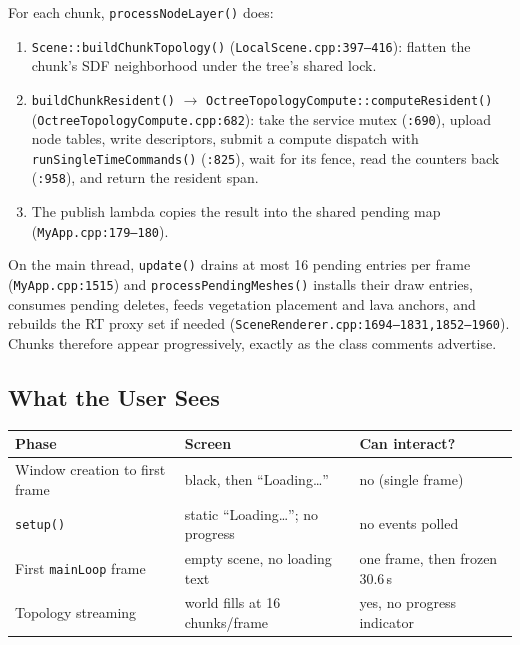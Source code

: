 \documentclass[11pt,a4paper]{article}
\begin{document}
For each chunk, \texttt{processNodeLayer()} does:

\begin{enumerate}[leftmargin=1.5em,itemsep=2pt]
\item \texttt{Scene::buildChunkTopology()} (\texttt{LocalScene.cpp:397--416}):
flatten the chunk's SDF neighborhood under the tree's shared lock.
\item \texttt{buildChunkResident()} $\rightarrow$
\texttt{OctreeTopologyCompute::computeResident()}
(\texttt{OctreeTopologyCompute.cpp:682}): take the service mutex
(\texttt{:690}), upload node tables, write descriptors, submit a compute
dispatch with \texttt{runSingleTimeCommands()} (\texttt{:825}), wait for its
fence, read the counters back (\texttt{:958}), and return the resident span.
\item The publish lambda copies the result into the shared pending map
(\texttt{MyApp.cpp:179--180}).
\end{enumerate}

On the main thread, \texttt{update()} drains at most 16 pending entries per
frame (\texttt{MyApp.cpp:1515}) and \texttt{processPendingMeshes()} installs
their draw entries, consumes pending deletes, feeds vegetation placement and
lava anchors, and rebuilds the RT proxy set if needed
(\texttt{SceneRenderer.cpp:1694--1831,1852--1960}). Chunks therefore appear
progressively, exactly as the class comments advertise.

\subsection{What the User Sees}

\begin{table}[h]
\centering
\small
\begin{tabular}{@{}L{4.1cm}L{6.6cm}L{4.6cm}@{}}
\toprule
\textbf{Phase} & \textbf{Screen} & \textbf{Can interact?} \\
\midrule
Window creation to first frame & black, then ``Loading\ldots'' & no (single frame) \\
\texttt{setup()} & static ``Loading\ldots''; no progress & no events polled \\
First \texttt{mainLoop} frame & empty scene, no loading text & one frame, then frozen 30.6\,s \\
Topology streaming & world fills at 16 chunks/frame & yes, no progress indicator \\
\bottomrule
\end{tabular}
\end{table}
\end{document}
